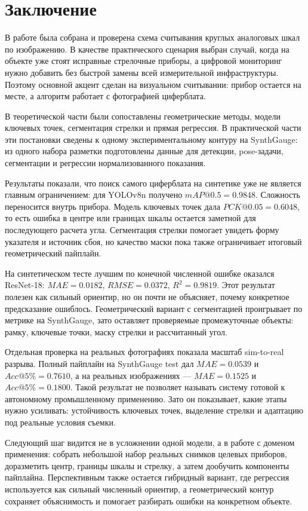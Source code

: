 \documentclass[a4paper,14pt]{extarticle}
\begin{document}
	\newpage
	\section{Заключение}

		В работе была собрана и проверена схема считывания круглых аналоговых шкал по изображению. В качестве практического сценария выбран случай, когда на объекте уже стоят исправные стрелочные приборы, а цифровой мониторинг нужно добавить без быстрой замены всей измерительной инфраструктуры. Поэтому основной акцент сделан на визуальном считывании: прибор остается на месте, а алгоритм работает с фотографией циферблата.

		В теоретической части были сопоставлены геометрические методы, модели ключевых точек, сегментация стрелки и прямая регрессия. В практической части эти постановки сведены к одному экспериментальному контуру на SynthGauge: из одного набора разметки подготовлены данные для детекции, pose-задачи, сегментации и регрессии нормализованного показания.

		Результаты показали, что поиск самого циферблата на синтетике уже не является главным ограничением: для YOLOv8n получено $mAP@0.5=0.9848$. Сложность переносится внутрь прибора. Модель ключевых точек дала $PCK@0.05=0.6048$, то есть ошибка в центре или границах шкалы остается заметной для последующего расчета угла. Сегментация стрелки помогает увидеть форму указателя и источник сбоя, но качество маски пока также ограничивает итоговый геометрический пайплайн.

		На синтетическом тесте лучшим по конечной численной ошибке оказался ResNet-18: $MAE=0.0182$, $RMSE=0.0372$, $R^2=0.9819$. Этот результат полезен как сильный ориентир, но он почти не объясняет, почему конкретное предсказание ошиблось. Геометрический вариант с сегментацией проигрывает по метрике на SynthGauge, зато оставляет проверяемые промежуточные объекты: рамку, ключевые точки, маску стрелки и рассчитанный угол.

		Отдельная проверка на реальных фотографиях показала масштаб sim-to-real разрыва. Полный пайплайн на SynthGauge test дал $MAE=0.0539$ и $Acc@5\%=0.7610$, а на реальных изображениях --- $MAE=0.1525$ и $Acc@5\%=0.1800$. Такой результат не позволяет называть систему готовой к автономному промышленному применению. Зато он показывает, какие этапы нужно усиливать: устойчивость ключевых точек, выделение стрелки и адаптацию под реальные условия съемки.

		Следующий шаг видится не в усложнении одной модели, а в работе с доменом применения: собрать небольшой набор реальных снимков целевых приборов, доразметить центр, границы шкалы и стрелку, а затем дообучить компоненты пайплайна. Перспективным также остается гибридный вариант, где регрессия используется как сильный численный ориентир, а геометрический контур сохраняет объяснимость и помогает разбирать ошибки на конкретном объекте.

	\newpage
	\printbibliography[heading=bibintoc]
\end{document}

